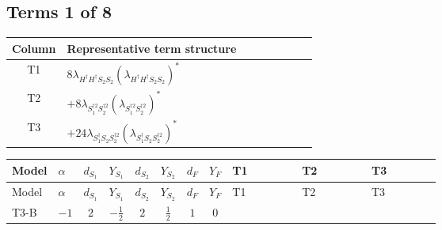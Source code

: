 \documentclass[8pt]{article}
\begin{document}
\begin{landscape}
\subsection*{Terms 1 of 8}
\begin{center}
\begin{tabular}{@{}c >{\raggedright\arraybackslash}p{0.82\linewidth}@{}}
\toprule
Column & Representative term structure \\
\midrule
T1 & \(\displaystyle 8 {\lambda_{H^\dagger H^\dagger S_2 S_2}} \left({\lambda_{H^\dagger H^\dagger S_2 S_2}}\right)^{*}\) \\
\midrule
T2 & \(\displaystyle +8 {\lambda_{S_1^{\dagger 2}S_2^{\dagger 2}}} \left({\lambda_{S_1^{\dagger 2}S_2^{\dagger 2}}}\right)^{*}\) \\
\midrule
T3 & \(\displaystyle +24 {\lambda_{S_1^\dagger S_2 S_2^{\dagger 2}}} \left({\lambda_{S_1^\dagger S_2 S_2^{\dagger 2}}}\right)^{*}\) \\
\midrule
\bottomrule
\end{tabular}
\end{center}
\smallskip
\tiny
\begin{longtable}{@{}llcccccc >{\raggedright\arraybackslash}p{0.21\linewidth} >{\raggedright\arraybackslash}p{0.21\linewidth} >{\raggedright\arraybackslash}p{0.21\linewidth}@{}}
\toprule
Model & $\alpha$ & $d_{S_1}$ & $Y_{S_1}$ & $d_{S_2}$ & $Y_{S_2}$ & $d_F$ & $Y_F$ & T1 & T2 & T3 \\
\midrule
\endfirsthead
\toprule
Model & $\alpha$ & $d_{S_1}$ & $Y_{S_1}$ & $d_{S_2}$ & $Y_{S_2}$ & $d_F$ & $Y_F$ & T1 & T2 & T3 \\
\midrule
\endhead
T3-B & $-1$ & $2$ & $-\frac{1}{2}$ & $2$ & $\frac{1}{2}$ & $1$ & $0$ & \scriptsize\adjustbox{max width=\linewidth}{$\begin{gathered} 8 {\lambda_{H^\dagger H^\dagger S_2 S_2}} \left({\lambda_{H^\dagger H^\dagger S_2 S_2}}\right)^{*}\end{gathered}$} & \scriptsize\adjustbox{max width=\linewidth}{$\begin{gathered} +8 {\lambda_{S_1^{\dagger 2}S_2^{\dagger 2}}} \left({\lambda_{S_1^{\dagger 2}S_2^{\dagger 2}}}\right)^{*}\end{gathered}$} & \scriptsize\adjustbox{max width=\linewidth}{$\begin{gathered} +24 {\lambda_{S_1^\dagger S_2 S_2^{\dagger 2}}} \left({\lambda_{S_1^\dagger S_2 S_2^{\dagger 2}}}\right)^{*}\end{gathered}$} \\
\midrule

\end{longtable}
\end{landscape}
\end{document}

